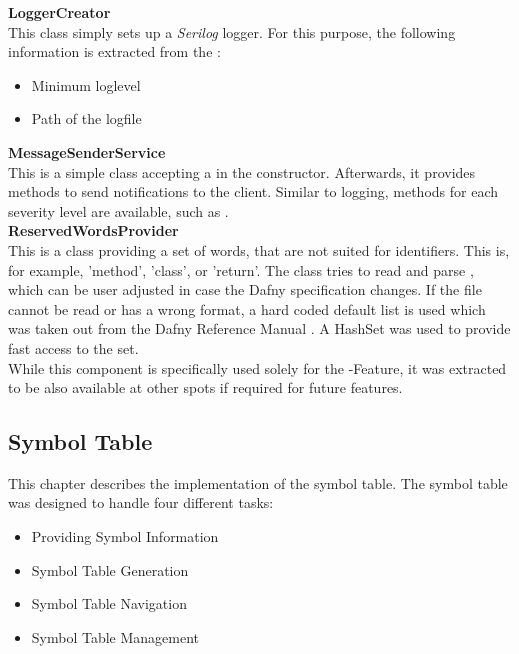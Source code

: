 \textbf{LoggerCreator}\\
This class simply sets up a \textit{Serilog} \cite{serilog} logger.
For this purpose, the following information is extracted from the :
\begin{itemize}
    \item Minimum loglevel
    \item Path of the logfile
\end{itemize}

\textbf{MessageSenderService}\\
This is a simple class accepting a  in the constructor.
Afterwards, it provides methods to send notifications to the client.
Similar to logging, methods for each severity level are available, such as .\\

\textbf{ReservedWordsProvider}\\
This is a class providing a set of words, that are not suited for identifiers.
This is, for example, 'method', 'class', or 'return'.
The class tries to read and parse , which can be user adjusted in case the Dafny specification changes.
If the file cannot be read or has a wrong format, a hard coded default list is used which was taken out from the Dafny Reference Manual \cite{dafnyReferenceManual}.
A HashSet was used to provide fast access to the set.\\

While this component is specifically used solely for the -Feature, it was extracted to be also available at other spots if required for future features.










\subsection{Symbol Table}
This chapter describes the implementation of the symbol table.
The symbol table was designed to handle four different tasks:

\begin{itemize}
    \item Providing Symbol Information
    \item Symbol Table Generation
    \item Symbol Table Navigation
    \item Symbol Table Management
\end{itemize}

